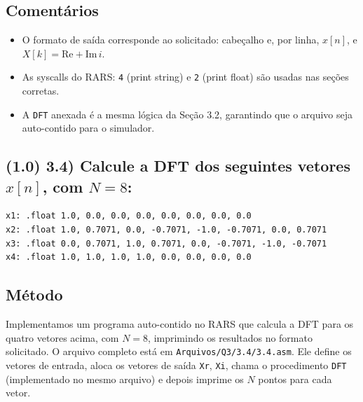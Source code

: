 \documentclass[12pt,a4paper]{article}
\begin{document}
\subsection*{Comentários}
\begin{itemize}
  \item O formato de saída corresponde ao solicitado: cabeçalho e, por linha, $x[n]$, e $X[k]=\mathrm{Re}+\mathrm{Im}\,i$.
  \item As syscalls do RARS: \texttt{4} (print string) e \texttt{2} (print float) são usadas nas seções corretas.
  \item A \texttt{DFT} anexada é a mesma lógica da Seção 3.2, garantindo que o arquivo seja auto-contido para o simulador.
\end{itemize}

\subsection*{(1.0) 3.4) Calcule a DFT dos seguintes vetores $x[n]$, com $N=8$:}

\begin{verbatim}
x1: .float 1.0, 0.0, 0.0, 0.0, 0.0, 0.0, 0.0, 0.0
x2: .float 1.0, 0.7071, 0.0, -0.7071, -1.0, -0.7071, 0.0, 0.7071
x3: .float 0.0, 0.7071, 1.0, 0.7071, 0.0, -0.7071, -1.0, -0.7071
x4: .float 1.0, 1.0, 1.0, 1.0, 0.0, 0.0, 0.0, 0.0
\end{verbatim}



\subsection*{Método}
Implementamos um programa auto-contido no RARS que calcula a DFT para os quatro vetores acima, com $N=8$, imprimindo os resultados no formato solicitado. O arquivo completo está em \texttt{Arquivos/Q3/3.4/3.4.asm}. Ele define os vetores de entrada, aloca os vetores de saída \texttt{Xr}, \texttt{Xi}, chama o procedimento \texttt{DFT} (implementado no mesmo arquivo) e depois imprime os $N$ pontos para cada vetor.
\end{document}

